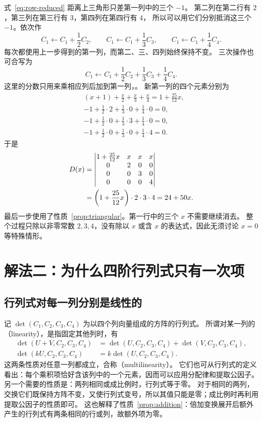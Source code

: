 \documentclass[UTF8,12pt,a4paper,fontset=fandol]{ctexart}
\begin{document}
式~\eqref{eq:row-reduced} 距离上三角形只差第一列中的三个 $-1$。
第二列在第二行有 $2$，第三列在第三行有 $3$，第四列在第四行有 $4$，
所以可以用它们分别抵消这三个 $-1$。依次作
\[
  C_1\leftarrow C_1+\frac12C_2,\qquad
  C_1\leftarrow C_1+\frac13C_3,\qquad
  C_1\leftarrow C_1+\frac14C_4.
\]
每次都使用上一步得到的第一列，而第二、三、四列始终保持不变。
三次操作也可合写为
\[
  C_1\leftarrow C_1+\frac12C_2+\frac13C_3+\frac14C_4.
\]
这里的分数只用来乘相应列后加到第一列，。
新第一列的四个元素分别为
\begin{align*}
  &(x+1)+\frac{x}{2}+\frac{x}{3}+\frac{x}{4}
    =1+\frac{25}{12}x,\\
  &-1+\frac12\cdot2+\frac13\cdot0+\frac14\cdot0=0,\\
  &-1+\frac12\cdot0+\frac13\cdot3+\frac14\cdot0=0,\\
  &-1+\frac12\cdot0+\frac13\cdot0+\frac14\cdot4=0.
\end{align*}
于是
\begin{align}
  D(x)
  &=\begin{vmatrix}
    1+\frac{25}{12}x&x&x&x\\
    0&2&0&0\\
    0&0&3&0\\
    0&0&0&4
  \end{vmatrix}\notag\\
  &=\left(1+\frac{25}{12}x\right)\cdot2\cdot3\cdot4
    =24+50x.
  \label{eq:triangular-calculation}
\end{align}
最后一步使用了性质~\ref{prop:triangular}。第一行中的三个 $x$ 不需要继续消去。
整个过程只除以非零常数 $2,3,4$，没有除以 $x$ 或含 $x$ 的表达式，因此无须讨论 $x=0$ 等特殊情形。

\section{解法二：为什么四阶行列式只有一次项}
\label{sec:linearity}

\subsection{行列式对每一列分别是线性的}

记 $\det(C_1,C_2,C_3,C_4)$ 为以四个列向量组成的方阵的行列式。
所谓对某一列的（linearity），是指固定其他列时，有
\begin{align*}
  \det(U+V,C_2,C_3,C_4)
  &=\det(U,C_2,C_3,C_4)+\det(V,C_2,C_3,C_4),\\
  \det(kU,C_2,C_3,C_4)
  &=k\det(U,C_2,C_3,C_4).
\end{align*}
这两条性质对任意一列都成立，合称（multilinearity）。
它们也可从行列式的定义看出：每个乘积项恰好含该列中的一个元素，因而可以应用分配律和提取公因子。
另一个需要的性质是：两列相同或成比例时，行列式等于零。
对于相同的两列，交换它们既保持方阵不变，又使行列式变号，所以其值只能是零；成比例时再利用提取公因子的性质即可。
这也解释了性质~\ref{prop:addition}：倍加变换展开后额外产生的行列式有两条相同的行或列，故额外项为零。
\end{document}
